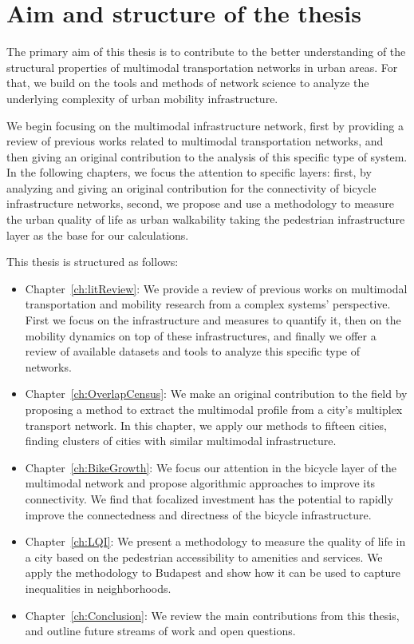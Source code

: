 
\section{Aim and structure of the thesis}

The primary aim of this thesis is to contribute to the better understanding of the structural properties of multimodal transportation networks in urban areas. For that, we build on the tools and methods of network science to analyze the underlying complexity of urban mobility infrastructure. 

We begin focusing on the multimodal infrastructure network, first by providing a review of previous works related to multimodal transportation networks, and then giving an original contribution to the analysis of this specific type of system. In the following chapters, we focus the attention to specific layers: first, by analyzing and giving an original contribution for the connectivity of bicycle infrastructure networks, second, we propose and use a methodology to measure the urban quality of life as urban walkability taking the pedestrian infrastructure layer as the base for our calculations.

This thesis is structured as follows:

\begin{itemize}
    \item Chapter~\ref{ch:litReview}: We provide a review of previous works on multimodal transportation and mobility research from a complex systems' perspective. First we focus on the infrastructure and measures to quantify it, then on the mobility dynamics on top of these infrastructures, and finally we offer a review of available datasets and tools to analyze this specific type of networks.
    \item Chapter~\ref{ch:OverlapCensus}: We make an original contribution to the field by proposing a method to extract the multimodal profile from a city's multiplex transport network. In this chapter, we apply our methods to fifteen cities, finding clusters of cities with similar multimodal infrastructure.
    \item Chapter~\ref{ch:BikeGrowth}: We focus our attention in the bicycle layer of the multimodal network and propose algorithmic approaches to improve its connectivity. We find that focalized investment has the potential to rapidly improve the connectedness and directness of the bicycle infrastructure.
    \item Chapter~\ref{ch:LQI}: We present a methodology to measure the quality of life in a city based on the pedestrian accessibility to amenities and services. We apply the methodology to Budapest and show how it can be used to capture inequalities in neighborhoods. 
    \item Chapter~\ref{ch:Conclusion}: We review the main contributions from this thesis, and outline future streams of work and open questions. 
\end{itemize}

